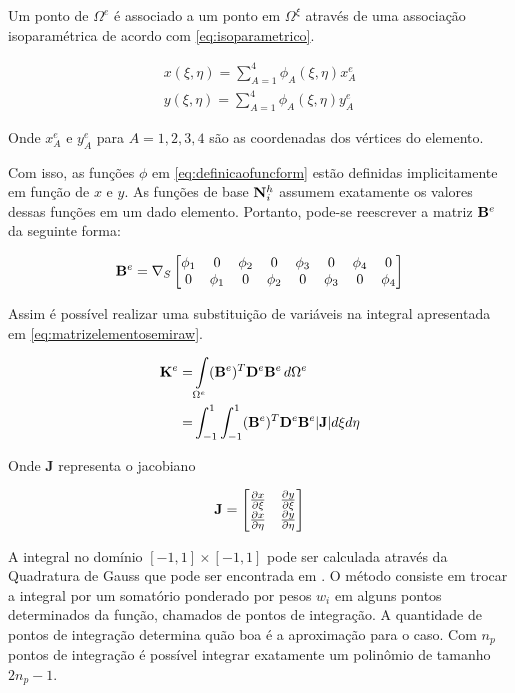 Um ponto de $\Omega^e$ é associado a um ponto em $\Omega^\xi$ através de uma associação isoparamétrica de acordo com \eqref{eq:isoparametrico}.


\begin{equation}\label{eq:isoparametrico}
\begin{matrix}
x(\xi, \eta) = \sum_{A=1}^{4} \phi_A(\xi, \eta) x^e_A \\
y(\xi, \eta) = \sum_{A=1}^{4} \phi_A(\xi, \eta) y^e_A
\end{matrix}
\end{equation}

Onde $x^e_A$ e $y^e_A$ para $A=1,2,3,4$ são as coordenadas dos vértices do elemento.

Com isso, as funções $\phi$ em \eqref{eq:definicaofuncform} estão definidas implicitamente em função de $x$ e $y$. As funções de base ${\mathbf{N}_{i}^h}$ assumem exatamente os valores dessas funções em um dado elemento. Portanto, pode-se reescrever a matriz $\mathbf{B}^e$ da seguinte forma:


\begin{equation} \label{eq:bephi}
    \mathbf{B}^e = \nabla_S \begin{bmatrix}
\phi_1 & 0      & \phi_2 & 0 & \phi_3 & 0 & \phi_4 & 0\\
0      & \phi_1 & 0 & \phi_2 & 0 & \phi_3 & 0 & \phi_4
\end{bmatrix}
\end{equation}


Assim é possível realizar uma substituição de variáveis na integral apresentada em \eqref{eq:matrizelementosemiraw}.


\begin{align}
\mathbf{K}^e      = & \int\limits_{\Omega^e}  (\mathbf{B}^e)^T \mathbf{D}^e \mathbf{B}^e \, d\Omega^e \nonumber \\
         = &  \int_{-1}^{1}\int_{-1}^{1}  (\mathbf{B}^e)^T \mathbf{D}^e \mathbf{B}^e |\mathbf{J}|   d\xi d\eta
\end{align}


Onde $\mathbf{J}$ representa o jacobiano

\begin{equation}
\mathbf{J} = \begin{bmatrix}
\dxi[x]   &  \dxi[y]    \\
\deta[x]  &  \deta[y]
\end{bmatrix}
\label{eq:jacobiano}
\end{equation}


A integral no domínio $[-1, 1] \times [-1,1] $ pode ser calculada através da Quadratura de Gauss que pode ser encontrada em \cite{jacob}. O método consiste em trocar a integral por um somatório ponderado por pesos $w_i$ em alguns pontos determinados da função, chamados de pontos de integração. A quantidade de pontos de integração determina quão boa é a aproximação para o caso. Com $n_p$ pontos de integração é possível integrar exatamente um
polinômio de tamanho $2n_p - 1$. %


